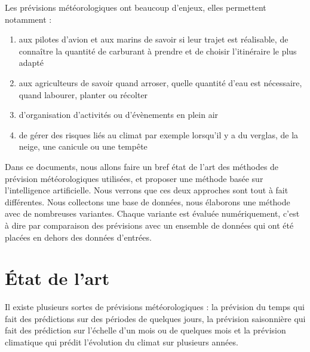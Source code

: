 \documentclass[11pt,a4paper]{article}
\begin{document}
\vspace {0.6cm}
Les prévisions météorologiques ont beaucoup d'enjeux, elles permettent notamment :
\begin {enumerate}
\item aux pilotes d'avion et aux marins de savoir si leur trajet est réalisable, de connaître la quantité de carburant à prendre et de choisir l'itinéraire le plus adapté
\item aux agriculteurs de savoir quand arroser, quelle quantité d'eau est nécessaire, quand labourer, planter ou récolter 
\item d'organisation d'activités ou d'évènements en plein air
\item de gérer des risques liés au climat par exemple lorsqu'il y a du verglas, de la neige, une canicule ou une tempête
\end{enumerate}

 
Dans ce documents, nous allons faire un bref état de l'art des méthodes de prévision météorologiques utilisées, et proposer une méthode basée sur l'intelligence artificielle. Nous verrons que ces deux approches sont tout à fait différentes. Nous collectons une base de données, nous élaborons une méthode avec de nombreuses variantes. Chaque variante est évaluée numériquement, c'est à dire par comparaison des prévisions avec un ensemble de données qui ont été placées en dehors des données d'entrées.


 
\section{État de l'art}

Il existe plusieurs sortes de prévisions météorologiques : la prévision du temps qui fait des prédictions sur des périodes de quelques jours, la prévision saisonnière qui fait des prédiction sur l'échelle d'un mois ou de quelques mois et la prévision climatique qui prédit l'évolution du climat sur plusieurs années.
\end{document}
